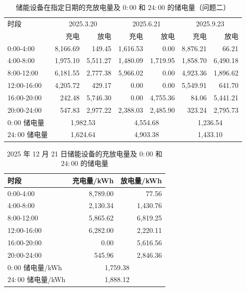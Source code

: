 \begin{table}[htbp]
  \centering
  \caption{储能设备在指定日期的充放电量及 $0{:}00$ 和 $24{:}00$ 的储电量（问题二）}
  \label{tab:p2-storage}
  \small
  \begin{tabular}{lrrrrrr}
    \toprule
    时段 & \multicolumn{2}{c}{2025.3.20} & \multicolumn{2}{c}{2025.6.21} & \multicolumn{2}{c}{2025.9.23} \\
     & 充电 & 放电 & 充电 & 放电 & 充电 & 放电 \\
    \midrule
    0{:}00-4{:}00 & 8,166.69 & 149.45 & 1,616.53 & 0.00 & 8,876.21 & 66.21 \\
    4{:}00-8{:}00 & 1,975.10 & 5,511.27 & 1,480.09 & 1,719.95 & 1,858.70 & 6,490.18 \\
    8{:}00-12{:}00 & 6,181.55 & 2,777.38 & 5,966.02 & 0.00 & 4,923.36 & 1,896.62 \\
    12{:}00-16{:}00 & 4,205.72 & 429.17 & 0.00 & 0.00 & 5,549.91 & 641.70 \\
    16{:}00-20{:}00 & 242.48 & 5,746.30 & 0.00 & 4,755.36 & 84.06 & 5,441.21 \\
    20{:}00-24{:}00 & 547.83 & 2,977.22 & 2,388.03 & 2,485.90 & 323.24 & 2,795.73 \\
    \midrule
    $0{:}00$ 储电量 & \multicolumn{2}{c}{1,982.53} & \multicolumn{2}{c}{4,554.68} & \multicolumn{2}{c}{1,236.54} \\
    $24{:}00$ 储电量 & \multicolumn{2}{c}{1,624.64} & \multicolumn{2}{c}{4,903.38} & \multicolumn{2}{c}{1,433.10} \\
  \end{tabular}
\end{table}

\begin{table}[htbp]
  \centering
  \caption{2025 年 12 月 21 日储能设备的充放电量及 $0{:}00$ 和 $24{:}00$ 的储电量}
  \label{tab:p2-storage-dec}
  \small
  \begin{tabular}{lrr}
    \toprule
    时段 & 充电量/kWh & 放电量/kWh \\
    \midrule
    0{:}00-4{:}00 & 8,789.00 & 77.56 \\
    4{:}00-8{:}00 & 2,130.34 & 1,430.76 \\
    8{:}00-12{:}00 & 5,865.62 & 6,819.25 \\
    12{:}00-16{:}00 & 6,282.00 & 2,220.11 \\
    16{:}00-20{:}00 & 0.00 & 5,616.56 \\
    20{:}00-24{:}00 & 545.96 & 2,846.36 \\
    \midrule
    $0{:}00$ 储电量/kWh & \multicolumn{2}{c}{1,759.38} \\
    $24{:}00$ 储电量/kWh & \multicolumn{2}{c}{1,888.12} \\
    \bottomrule
  \end{tabular}
\end{table}

